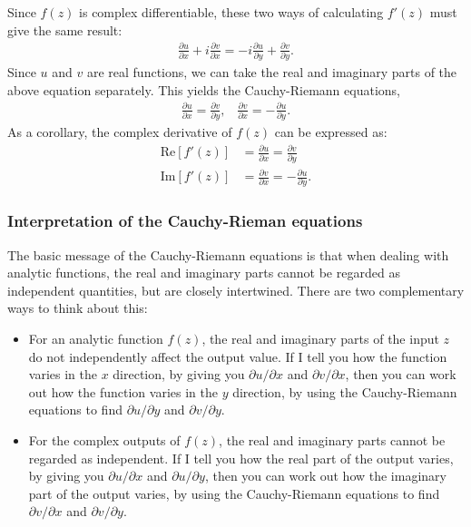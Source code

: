 \documentclass[10pt,a4paper]{article}
\begin{document}
Since $f(z)$ is complex differentiable, these two ways of calculating
$f'(z)$ must give the same result:
\begin{align}
  \frac{\partial u}{\partial x} + i \frac{\partial v}{\partial x} = -i\frac{\partial u}{\partial y} + \frac{\partial v}{\partial y}.
\end{align}
Since $u$ and $v$ are real functions, we can take the real and imaginary parts of the above equation separately.  This yields the Cauchy-Riemann equations,
\begin{align}
  \frac{\partial u}{\partial x} = \frac{\partial v}{\partial y}, \;\;\; \frac{\partial v}{\partial x} = -\frac{\partial u}{\partial y}.
\end{align}
As a corollary, the complex derivative of $f(z)$ can be expressed as:
\begin{align}
  \mathrm{Re}\left[f'(z)\right] &= \frac{\partial u}{\partial x} = \frac{\partial v}{\partial y} \\
  \mathrm{Im}\left[f'(z)\right] &= \frac{\partial v}{\partial x} = -\frac{\partial u}{\partial y}.
\end{align}

\subsubsection{Interpretation of the Cauchy-Rieman equations}
\label{interpretation-of-the-cauchy-riemann-equations}

The basic message of the Cauchy-Riemann equations is that when dealing
with analytic functions, the real and imaginary parts cannot be
regarded as independent quantities, but are closely intertwined.
There are two complementary ways to think about this:

\begin{itemize}
\item For an analytic function $f(z)$, the real and imaginary parts of
  the input $z$ do not independently affect the output value.  If I
  tell you how the function varies in the $x$ direction, by giving you
  $\partial u/\partial x$ and $\partial v/\partial x$, then you can
  work out how the function varies in the $y$ direction, by using the
  Cauchy-Riemann equations to find $\partial u/\partial y$ and
  $\partial v/\partial y$.

\item For the complex outputs of $f(z)$, the real and imaginary parts
  cannot be regarded as independent.  If I tell you how the real part
  of the output varies, by giving you $\partial u/\partial x$ and
  $\partial u/\partial y$, then you can work out how the imaginary
  part of the output varies, by using the Cauchy-Riemann equations to
  find $\partial v/\partial x$ and $\partial v/\partial y$.
\end{itemize}
\end{document}
